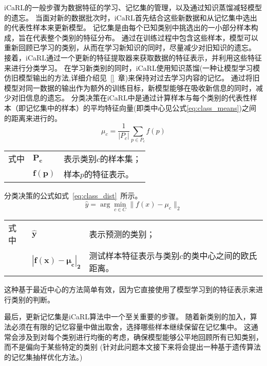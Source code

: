 iCaRL的一般步骤为数据特征的学习、记忆集的管理，以及通过知识蒸馏减轻模型的遗忘。
当面对新的数据批次时，iCaRL首先结合这些新数据和从记忆集中选出的代表性样本来更新模型。
记忆集是由每个已知类别中挑选出的一小部分样本构成，旨在代表整个类别的特征分布。
通过在训练过程中包含这些样本，模型可以重新回顾已学习的类别，从而在学习新知识的同时，尽量减少对旧知识的遗忘。
接着，iCaRL通过一个更新的特征提取器来获取数据的特征表示，并利用这些特征来进行分类学习。
在学习新类别的同时，iCaRL使用知识蒸馏(一种让模型学习模仿旧模型输出的方法,详细介绍见~\ref{}~章)来保持对过去学习内容的记忆。
通过将旧模型对同一数据的输出作为额外的训练目标，新模型能够在吸收新信息的同时，减少对旧信息的遗忘。
分类决策在iCaRL中是通过计算样本与每个类别的代表性样本（即记忆集中的样本）的平均特征向量(即类中心见公式\ref{eq:class_means})之间的距离来进行的。
\begin{equation}
  \label{eq:class_means}
  \mu_c = \frac{1}{|P_c|} \sum_{p \in P_c} f(p)
\end{equation}
\begin{flushleft}
  \renewcommand\arraystretch{1.25}
  \begin{tabularx}{\textwidth}{@{}>{\normalsize\rm}l@{\quad}>{\normalsize\rm}l@{——}>{\normalsize\rm}X@{}}
  式中& $\symbf{P_c}$ &表示类别$c$的样本集；\\
  &  $\symbf{f(p)}$&样本$p$的特征表示。\\
  \end{tabularx}\vspace{.5ex}%
\end{flushleft}
分类决策的公式如式~\ref{eq:class_dist}~所示。
\begin{equation}
  \label{eq:class_dist}
  \hat{y} = \arg\min_{c \in C} \|f(x) - \mu_c\|_2
\end{equation}
\begin{flushleft}
  \renewcommand\arraystretch{1.25}
  \begin{tabularx}{\textwidth}{@{}>{\normalsize\rm}l@{\quad}>{\normalsize\rm}l@{——}>{\normalsize\rm}X@{}}
  式中& $\symbf{\hat{y}}$ &表示预测的类别；\\
  &  $\symbf{|f(x) - \mu_c|_2}$&测试样本特征表示与类别$c$的类中心之间的欧氏距离。\\
  \end{tabularx}\vspace{.5ex}%
\end{flushleft}
这种基于最近中心的方法简单有效，因为它直接使用了模型学习到的特征表示来进行类别的判断。

最后，更新记忆集是iCaRL算法中一个至关重要的步骤。
随着新类别的加入，算法必须在有限的记忆容量中做出取舍，选择哪些样本继续保留在记忆集中。
这通常会涉及到对每个类别进行均衡的考虑，确保模型能够公平地回顾所有已知类别，而不是偏向于某些特定的类别
(针对此问题本文接下来将会提出一种基于遗传算法的记忆集抽样优化方法。)

